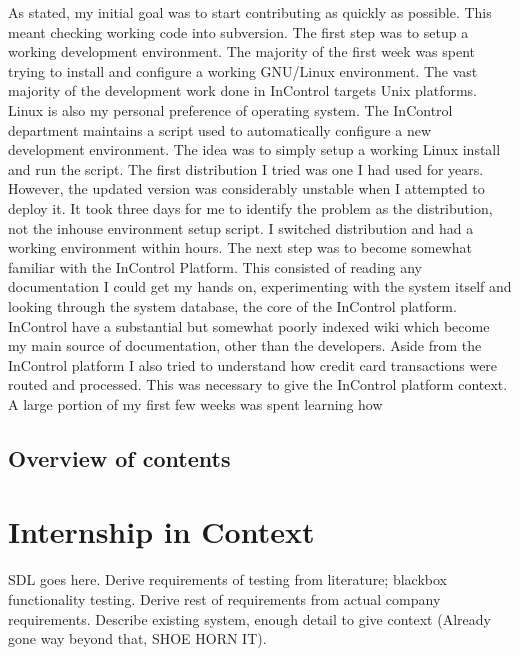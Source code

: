 \documentclass[a4paper,12pt, titlepage]{article}
\begin{document}
As stated, my initial goal was to start contributing as quickly as possible. This meant checking working code into subversion. The first step was to setup a working development environment. 
The majority of the first week was spent trying to install and configure a working GNU/Linux environment. The vast majority of the development work done in InControl targets Unix platforms. Linux is also my personal preference of operating system. The InControl department maintains a script used to automatically configure a new development environment. The idea was to simply setup a working Linux install and run the script. The first distribution I tried was one I had used for years. However, the updated version was considerably unstable when I attempted to deploy it. It took three days for me to identify the problem as the distribution, not the inhouse environment setup script. I switched distribution and had a working environment within hours. The next step was to become somewhat familiar with the InControl Platform. This consisted of reading any documentation I could get my hands on, experimenting with the system itself and looking through the system database, the core of the InControl platform.
InControl have a substantial but somewhat poorly indexed wiki which become my main source of documentation, other than the developers. Aside from the InControl platform I also tried to understand how credit card transactions were routed and processed. This was necessary to give the InControl platform context.
A large portion of my first few weeks was spent learning how 

\subsection{Overview of contents}


\section{Internship in Context}
SDL goes here. Derive requirements of testing from literature; blackbox functionality testing. Derive rest of requirements from actual company requirements. Describe existing system, enough detail to give context (Already gone way beyond that, SHOE HORN IT).
\end{document}
